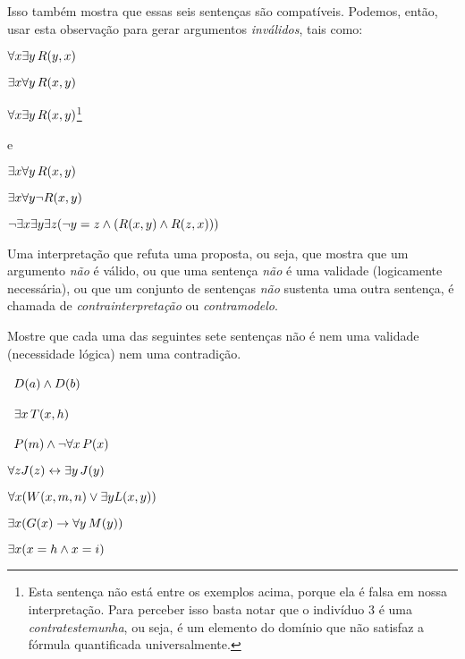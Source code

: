 Isso também mostra que essas seis sentenças são compatíveis.
Podemos, então, usar esta observação para gerar argumentos \emph{inválidos}, tais como:
\begin{earg}
	\item[] $\forall x \exists y\, \mathord{R}(y,x)$
	\item[] $\exists x \forall y\, \mathord{R}(x,y)$
	\item[\therefore] $\forall x \exists y\, \mathord{R}(x,y)$\footnote{
		Esta sentença não está entre os exemplos acima, porque ela é falsa em nossa interpretação.
		Para perceber isso basta notar que o indivíduo 3 é uma \textit{contratestemunha}, ou seja, é um elemento do domínio que não satisfaz a fórmula quantificada universalmente.}
\end{earg}
e
\begin{earg}
	\item[] $\exists x \forall y\, \mathord{R}(x,y)$
	\item[] $\exists x \forall y \neg \mathord{R}(x,y)$
	\item[\therefore] $\neg \exists x \exists y \exists z (\neg y = z \wedge (\mathord{R}(x,y) \wedge \mathord{R}(z,x)))$
\end{earg}

Uma interpretação que refuta uma proposta, ou seja, que mostra que um argumento \emph{não} é válido, ou que uma sentença \emph{não} é uma validade (logicamente necessária), ou que um conjunto de sentenças \emph{não} sustenta uma outra sentença, é chamada de \emph{contrainterpretação} ou \emph{contramodelo}.



\practiceproblems

\solutions
\problempart
\label{pr.Contingent}
Mostre que cada uma das seguintes sete sentenças não é nem uma validade (necessidade lógica) nem uma contradição.
\begin{earg}
\item \leftsolutions\ $\mathord{D}(a)  \wedge \mathord{D}(b)$
\item \leftsolutions\ $\exists x\, \mathord{T}(x,h)$
\item \leftsolutions\ $\mathord{P}(m)  \wedge \neg\forall x\, \mathord{P}(x)$
\item $\forall z \mathord{J}(z) \leftrightarrow \exists y\, \mathord{J}(y)$
\item $\forall x (\mathord{W}(x,m,n) \vee \exists y\mathord{L}(x,y))$
\item $\exists x (\mathord{G}(x) \rightarrow \forall y\, \mathord{M}(y))$
\item $\exists x (x = h \wedge x = i)$
\end{earg}

